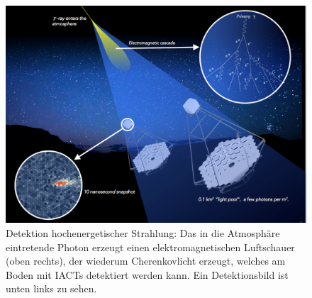\begin{figure}[htbp]
\centering
\includegraphics[width=\textwidth]{Images/detection.png}
\caption{Detektion hochenergetischer Strahlung: Das in die Atmosphäre eintretende Photon erzeugt einen elektromagnetischen Luftschauer (oben rechts), der wiederum Cherenkovlicht erzeugt, welches am Boden mit IACTs detektiert werden kann. Ein Detektionsbild ist unten links zu sehen.\cite{Flickr}}
\label{img:detection}
\end{figure}
